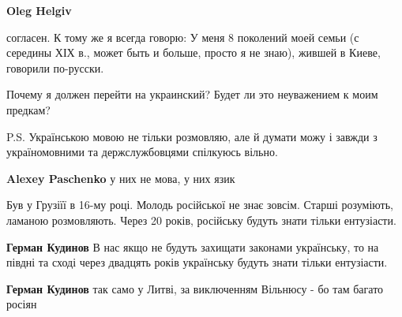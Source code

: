 \begin{itemize}
\begin{itemize}
\textbf{Oleg Helgiv} 

согласен. К тому же я всегда говорю: У меня 8 поколений моей семьи (с середины
ХІХ в., может быть и больше, просто я не знаю), жившей в Киеве, говорили
по-русски.

Почему я должен перейти на украинский? Будет ли это неуважением к моим предкам?

P.S. Українською мовою не тільки розмовляю, але й думати можу \Smiley[1.0][yellow] і завжди з
україномовними та держслужбовцями спілкуюсь вільно.


 
\textbf{Alexey Paschenko} у них не мова, у них язик
\end{itemize}

 

Був у Грузіїї в 16-му році. Молодь російської не знає зовсім. Старші розуміють,
ламаною розмовляють. Через 20 років, російську будуть знати тільки ентузіасти.

\begin{itemize}
 
\textbf{Герман Кудинов} В нас якщо не будуть захищати законами українську, то на півдні та сході через двадцять років українську будуть знати тільки ентузіасти.

 
\textbf{Герман Кудинов} так само у Литві, за виключенням Вільнюсу - бо там багато росіян

 

\end{itemize}
\end{itemize}
